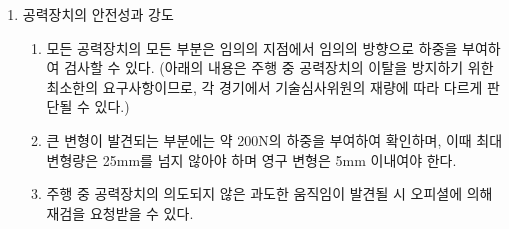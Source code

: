 \documentclass[final,a4paper,10pt]{report}
\begin{document}
\begin{enumerate}
  \item\label{rule:formula-technical.aerodynamics.structural-testing} 공력장치의 안전성과 강도
  \label{item:공력장치의 안전성과 강도}
    \begin{enumerate}
      \item\label{rule:formula-technical.aerodynamics.structural-testing.arbitrary-point-load-test} 모든 공력장치의 모든 부분은 임의의 지점에서 임의의 방향으로 하중을 부여하여 검사할 수 있다. (아래의 내용은 주행 중 공력장치의 이탈을 방지하기 위한 최소한의 요구사항이므로, 각 경기에서 기술심사위원의 재량에 따라 다르게 판단될 수 있다.)
      \item\label{rule:formula-technical.aerodynamics.structural-testing.load-200n-deflection-limits} 큰 변형이 발견되는 부분에는 약 200N의 하중을 부여하여 확인하며, 이때 최대 변형량은 25mm를 넘지 않아야 하며 영구 변형은 5mm 이내여야 한다.
      \item\label{rule:formula-technical.aerodynamics.structural-testing.excess-movement-reinspection} 주행 중 공력장치의 의도되지 않은 과도한 움직임이 발견될 시 오피셜에 의해 재검을 요청받을 수 있다.
    \end{enumerate}
\end{enumerate}
\end{document}
